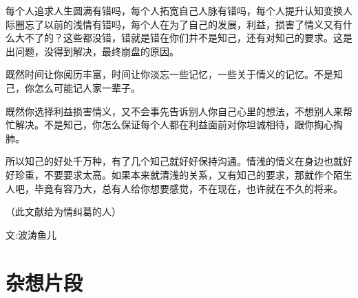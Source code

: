 \documentclass[color=green,mathpazo,titlestyle=hang]{elegantbook}
\begin{document}
每个人追求人生圆满有错吗，每个人拓宽自己人脉有错吗，每个人提升认知变换人际圈忘了以前的浅情有错吗，每个人在为了自己的发展，利益，损害了情义又有什么大不了的？这些都没错，错就是错在你们并不是知己，还有对知己的要求。这是出问题，没得到解决，最终崩盘的原因。

既然时间让你阅历丰富，时间让你淡忘一些记忆，一些关于情义的记忆。不是知己，你怎么可能记人家一辈子。

既然你选择利益损害情义，又不会事先告诉别人你自己心里的想法，不想别人来帮忙解决。不是知己，你怎么保证每个人都在利益面前对你坦诚相待，跟你掏心掏肺。

所以知己的好处千万种，有了几个知己就好好保持沟通。情浅的情义在身边也就好好珍重，不要要求太高。如果本来就清浅的关系，又有知己的要求，那就作个陌生人吧，毕竟有容乃大，总有人给你想要感觉，不在现在，也许就在不久的将来。

（此文献给为情纠葛的人）

文:波涛鱼儿


\chapter{杂想片段}
\end{document}
